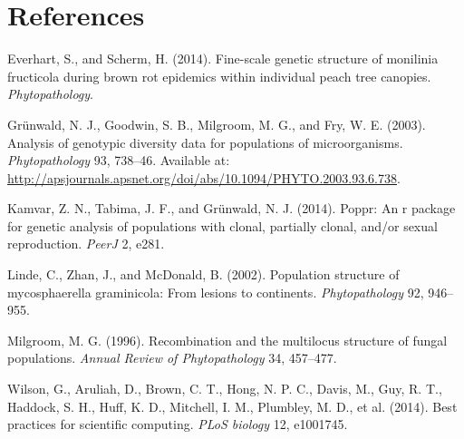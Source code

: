 \documentclass{frontiersSCNS} %
\begin{document}
\section*{References}\label{references}

Everhart, S., and Scherm, H. (2014). Fine-scale genetic structure of
monilinia fructicola during brown rot epidemics within individual peach
tree canopies. \emph{Phytopathology}.

Grünwald, N. J., Goodwin, S. B., Milgroom, M. G., and Fry, W. E. (2003).
Analysis of genotypic diversity data for populations of microorganisms.
\emph{Phytopathology} 93, 738--46. Available at:
\url{http://apsjournals.apsnet.org/doi/abs/10.1094/PHYTO.2003.93.6.738}.

Kamvar, Z. N., Tabima, J. F., and Gr{ü}nwald, N. J. (2014). Poppr: An r
package for genetic analysis of populations with clonal, partially
clonal, and/or sexual reproduction. \emph{PeerJ} 2, e281.

Linde, C., Zhan, J., and McDonald, B. (2002). Population structure of
mycosphaerella graminicola: From lesions to continents.
\emph{Phytopathology} 92, 946--955.

Milgroom, M. G. (1996). Recombination and the multilocus structure of
fungal populations. \emph{Annual Review of Phytopathology} 34, 457--477.

Wilson, G., Aruliah, D., Brown, C. T., Hong, N. P. C., Davis, M., Guy,
R. T., Haddock, S. H., Huff, K. D., Mitchell, I. M., Plumbley, M. D., et
al. (2014). Best practices for scientific computing. \emph{PLoS biology}
12, e1001745.
\end{document}
